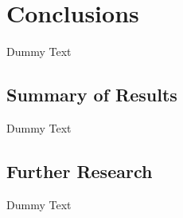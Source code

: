\chapter{Conclusions}

Dummy Text

\section{Summary of Results}

Dummy Text

\section{Further Research}

Dummy Text  \cite{latexcompanion}
